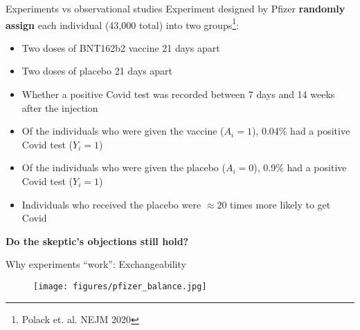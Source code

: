 \documentclass{beamer}
\def\independenT#1#2{\mathrel{\rlap{$#1#2$}\mkern2mu{#1#2}}}
\newcommand\indep{\protect\mathpalette{\protect\independenT}{\perp}}
\begin{document}
\begin{frame}{Experiments vs observational studies}
Experiment designed by Pfizer \textbf{randomly assign} each individual (43,000 total) into two groups\footnote{Polack et. al. NEJM 2020}:
\begin{itemize}
        \item Two doses of BNT162b2 vaccine 21 days apart
        \item Two doses of placebo 21 days apart
        \item Whether a positive Covid test was recorded between 7 days and 14 weeks after the injection
\end{itemize}
\vspace{1em}

\pause
     \begin{itemize}
         \item Of the individuals who were given the vaccine ($A_i = 1$), 0.04\% had a positive Covid test ($Y_i = 1$)
         \item Of the individuals who were given the placebo ($A_i = 0$), 0.9\% had a positive Covid test ($Y_i = 1$)
         \item Individuals who received the placebo were $\approx 20$ times more likely to get Covid 
     \end{itemize}

\pause \vspace{1em}
\textbf{Do the skeptic's objections still hold?}

\end{frame}

\begin{frame}{Why experiments ``work'': Exchangeability}

\begin{figure}
    \centering
    \texttt{[image: figures/pfizer\_balance.jpg]}
\end{figure}

\end{frame}



\end{document}
